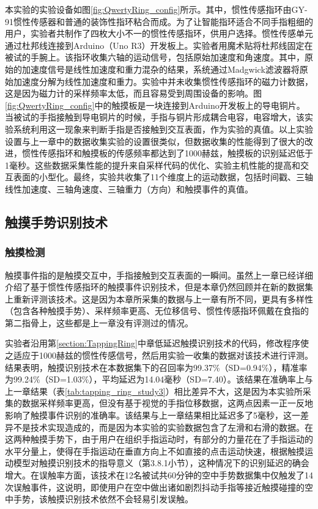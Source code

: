 本实验的实验设备如图\ref{fig:QwertyRing_config}所示。其中，惯性传感指环由GY-91惯性传感器和普通的装饰性指环粘合而成。为了让智能指环适合不同手指粗细的用户，实验者共制作了四枚大小不一的惯性传感指环，供用户选择。惯性传感单元通过杜邦线连接到Arduino（Uno R3）开发板上。实验者用魔术贴将杜邦线固定在被试的手腕上。该指环收集六轴的运动信号，包括原始加速度和角速度。其中，原始的加速度信号是线性加速度和重力混杂的结果，系统通过Madgwick滤波器\cite{madgwick2010efficient}将原始加速度分解为线性加速度和重力。实验中并未收集惯性传感指环的磁力计数据，这是因为磁力计的采样频率太低，而且容易受到周围设备的影响。图\ref{fig:QwertyRing_config}中的触摸板是一块连接到Arduino开发板上的导电铜片。当被试的手指接触到导电铜片的时候，手指与铜片形成耦合电容，电容增大，该实验系统利用这一现象来判断手指是否接触到交互表面\cite{badger2018capacitive}，作为实验的真值。以上实验设置与上一章中的数据收集实验的设置很类似，但数据收集的性能得到了很大的改进，惯性传感指环和触摸板的传感频率都达到了1000赫兹，触摸板的识别延迟低于1毫秒。这些数据采集性能的提升来自采样代码的优化、实验主机性能的提高和交互表面的小型化。最终，实验共收集了11个维度上的运动数据，包括时间戳、三轴线性加速度、三轴角速度、三轴重力（方向）和触摸事件的真值。

\subsection{触摸手势识别技术}\label{section:model_QwertyRing}

\subsubsection{触摸检测}

触摸事件指的是触摸交互中，手指接触到交互表面的一瞬间。虽然上一章已经详细介绍了基于惯性传感指环的触摸事件识别技术，但是本章仍然回顾并在新的数据集上重新评测该技术。这是因为本章所采集的数据与上一章有所不同，更具有多样性（包含各种触摸手势）、采样频率更高、无位移信号、惯性传感指环佩戴在食指的第二指骨上，这些都是上一章没有评测过的情况。

实验者沿用第\ref{section:TappingRing}中章低延迟触摸识别技术的代码，修改程序使之适应于1000赫兹的惯性传感信号，然后用实验一收集的数据对该技术进行评测。结果表明，触摸识别技术在本数据集下的召回率为99.37\%（SD=0.94\%），精准率为99.24\%（SD=1.03\%），平均延迟为14.04毫秒（SD=7.40）。该结果在准确率上与上一章结果（表\ref{tab:tapping_ring_study3}）相比差异不大，这是因为本实验所采集的数据采样频率更高，但没有基于视觉的手指位移数据，这两点因素一正一反地影响了触摸事件识别的准确率。该结果与上一章结果相比延迟多了5毫秒，这一差异不是技术实现造成的，而是因为本实验的实验数据包含了左滑和右滑的数据。在这两种触摸手势下，由于用户在组织手指运动时，有部分的力量花在了手指运动的水平分量上，使得在手指运动在垂直方向上不如直接的点击运动快速，根据触摸运动模型对触摸识别技术的指导意义（第3.8.1小节），这种情况下的识别延迟的确会增大。在误触率方面，该技术在12名被试共60分钟的空中手势数据集中仅触发了14次误触事件，这说明，即使用户在空中做出诸如剧烈抖动手指等接近触摸碰撞的空中手势，该触摸识别技术依然不会轻易引发误触。

